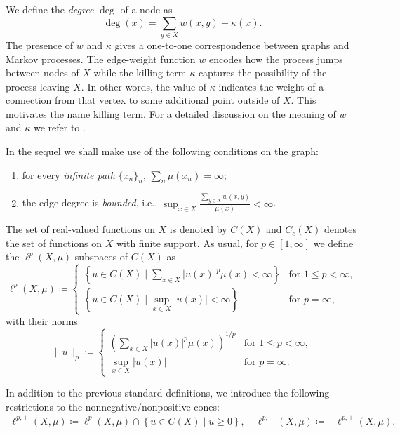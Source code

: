 \documentclass[journal]{article}
\makeatletter
\newcommand{\conditem}[2]{%
  \item[#2]%
  \protected@edef\@currentlabel{#2}%
  \label{#1}%
}
\theoremstyle{nonitalic}
\theoremstyle{nonitalic}
\theoremstyle{plain} %
\numberwithin{equation}{section}
\makeatother
\begin{document}
We define the \textit{degree} $\operatorname{deg}$ of a node as
\begin{equation*}
\operatorname{deg}(x) = \sum_{y\in X} w(x,y) + \kappa(x).
\end{equation*}
 The presence of $w$ and $\kappa$ gives a one-to-one correspondence between graphs and Markov processes. The edge-weight function $w$ encodes how the process jumps between nodes of $X$ while the killing term $\kappa$ captures the possibility of the process leaving $X$. In other words, the value of $\kappa$ indicates the weight of a connection from that vertex to some
additional point outside of $X$. This motivates the name killing term. For a detailed discussion on the meaning of $w$ and $\kappa$ we refer to \cite[Part 0]{keller2021graphs}. 

 

In the sequel we shall make use of the following conditions on the graph:  


\begin{enumerate}[label={}, leftmargin=*, align=left]
  \conditem{IP}{\textbf{(IP)}} for every \textit{infinite path} $\{x_n\}_n$, $\sum_n \mu(x_n)=\infty$;
  \conditem{B}{\textbf{(B)}} the edge degree is \textit{bounded}, i.e., $\sup_{x\in X} \frac{\sum_{y\in X} w(x,y)}{\mu(x)}<\infty$.
\end{enumerate}



	
	The set of real-valued functions on $X$ is denoted by $C(X)$ and $C_c(X)$ denotes the set of functions on $X$ with finite support. As usual, for $p\in [1,\infty]$ we define the $\ell^p(X,\mu)$ subspaces of $C(X)$ as
	$$
	\ell^p(X,\mu)\coloneqq\begin{cases}
	\left\{ u \in C(X) \mid \sum_{x\in X} |u(x)|^p\mu(x)<\infty \right\} & \mbox{for } 1\leq p<\infty,\\
	\left\{ u \in C(X) \mid \sup_{x\in X}|u(x)|<\infty \right\} & \mbox{for } p =\infty,
	\end{cases}
	$$
	with their norms
	$$
	\|u\|_p\coloneqq \begin{cases}
	\left(\sum_{x\in X} |u(x)|^p\mu(x)\right)^{{1}/{p}} & \mbox{for } 1\leq p<\infty ,\\
	\sup_{x\in X}|u(x)| & \mbox{for } p =\infty.
	\end{cases}
	$$	

In addition to the previous standard definitions, we introduce the following restrictions to the nonnegative/nonpositive cones:
\begin{align*}
\ell^{p,+}\left(X,\mu\right)\coloneqq \ell^{p}\left(X,\mu\right) \cap \left\{ u \in C(X) \mid u\geq 0 \right\}, \quad
\ell^{p,-}\left(X,\mu\right)\coloneqq -\ell^{p,+}\left(X,\mu\right).
\end{align*}	
\end{document}
